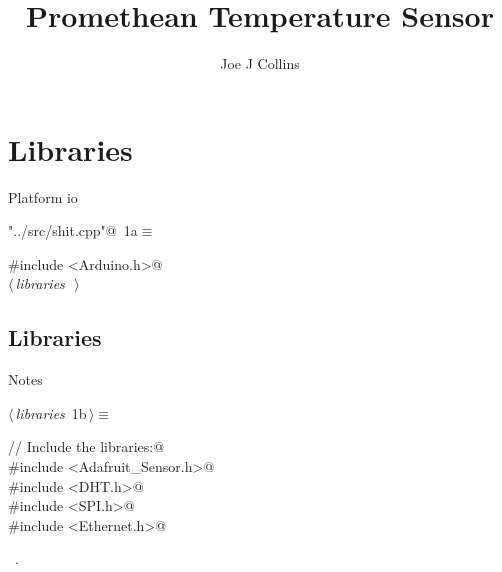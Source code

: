 \documentclass[a4paper, 12pt]{article}
\title{Promethean Temperature Sensor}
\author{Joe J Collins}
\begin{document}
\maketitle
\tableofcontents

\section{Libraries}

Platform io

\begin{flushleft} \small
\begin{minipage}{\linewidth}\label{scrap1}\raggedright\small
{}\verb@"../src/shit.cpp"@\nobreak\ {\footnotesize{1a}}$\equiv$
\vspace{-1ex}
\begin{list}{}{\setlength{\leftmargin}{1em}} \item
\mbox{}\verb@#include <Arduino.h>@\\
\mbox{}\verb@@$\langle\,${\itshape libraries}\ {\footnotesize {}}\,$\rangle\,$\verb@@\\
\mbox{}{\NWsep}
\end{list}
\vspace{-1ex}
\end{minipage}
\end{flushleft}


\subsection{Libraries}

Notes

\begin{flushleft} \small
\begin{minipage}{\linewidth}\label{scrap2}\raggedright\small
{}$\langle\,${\itshape libraries}\nobreak\ {\footnotesize{1b}}$\,\rangle\equiv$
\vspace{-1ex}
\begin{list}{}{\setlength{\leftmargin}{1em}} \item
\mbox{}\verb@// Include the libraries:@\\
\mbox{}\verb@#include <Adafruit_Sensor.h>@\\
\mbox{}\verb@#include <DHT.h>@\\
\mbox{}\verb@#include <SPI.h>@\\
\mbox{}\verb@#include <Ethernet.h>@\\
\mbox{}{\NWsep}
\end{list}
\vspace{-1ex}
\vspace{-1ex}
\footnotesize
\begin{list}{}{\setlength{\itemsep}{-\parsep}\setlength{\itemindent}{-\leftmargin}}
\item \NWtxtMacroRefIn\ .
\end{list}
\end{minipage}
\end{flushleft}
\end{document}
